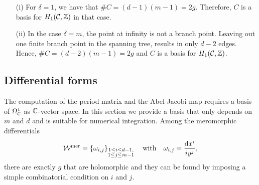 \documentclass[main.tex]{subfiles}
\begin{document}
  \begin{rmk}
  \begin{itemize}
   \item[(i)] For $\delta = 1$, we have that $\# C = (d-1)(m-1) = 2g$. Therefore, $C$ is a basis for $H_1(\mathcal{C},\mathbb{Z})$ in that case.
   \item[(ii)] In the case $\delta = m$, the point at infinity is not a branch point. Leaving out one finite branch point in the spanning tree, results in only $d-2$ edges. Hence,
   $\#C = (d-2)(m-1) = 2g$ and $C$ is a basis for $H_1(\mathcal{C},\mathbb{Z})$.
  \end{itemize}
  \end{rmk}



\subsection{Differential forms}\label{subsec:diff_forms}

    The computation of the period matrix and the Abel-Jacobi map requires a basis of $\Omega^1_{\mathcal{C}}$ as $\mathbb{C}$-vector space. In this section we provide a basis that only
   depends on $m$ and $d$ and is suitable for numerical integration. \abstand
    Among the meromorphic differentials
    \begin{align*}
 \mathcal{W}^{\text{mer}} = \left\{  \omega_{i,j}   \right\}_{\substack{1 \le i \le d-1, \\ 1 \le j \le m-1}} \quad \text{with} \quad \omega_{i,j} = \frac{ \mathrm d x^i}{i y^j},
  \end{align*}
  there are exactly $g$ that are holomorphic  and they can be found by imposing a simple combinatorial condition on $i$ and $j$.


   \bigskip
\end{document}
